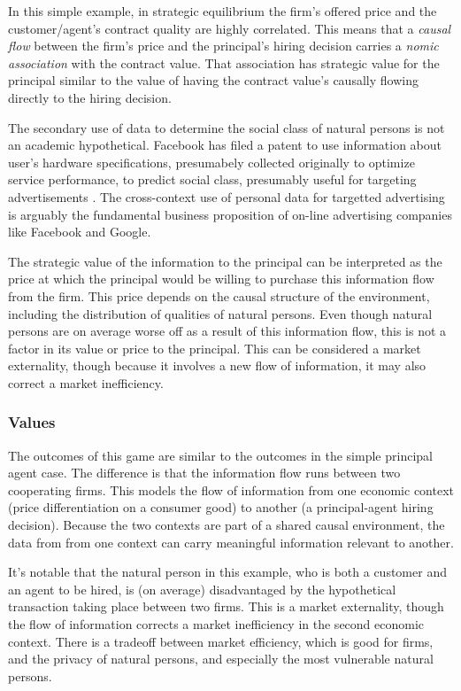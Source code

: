\documentclass[../thesis.tex]{subfiles}
\begin{document}
In this simple example, in strategic equilibrium the firm's offered
price and the customer/agent's contract quality
are highly correlated.
This means that a \emph{causal flow} between the firm's price and
the principal's hiring decision carries a \emph{nomic association}
with the contract value.
That association has strategic value for the principal similar to
the value of having the contract value's causally flowing directly
to the hiring decision.

The secondary use of data to determine the social class of
natural persons is not an academic hypothetical.
Facebook has filed a patent to use information about
user's hardware specifications, presumabely collected originally
to optimize service performance, to predict social class, presumably useful
for targeting advertisements \cite{cb_insights_research_2018}.
The cross-context use of personal data for targetted advertising
is arguably the fundamental business proposition of on-line
advertising companies like Facebook and Google.

The strategic value of the information to the principal can
be interpreted as the price at which the principal would
be willing to purchase this information flow from the firm.
This price depends on the causal structure of the environment,
including the distribution of qualities of natural persons.
Even though natural persons are on average worse off as a result
of this information flow, this is not a factor in its
value or price to the principal.
This can be considered a market externality, though
because it involves a new flow of information, it
may also correct a market inefficiency.

\subsubsection{Values}

The outcomes of this game are similar to the outcomes
in the simple principal agent case.
The difference is that the information flow
runs between two cooperating firms.
This models the flow of information from one
economic context (price differentiation on a consumer good)
to another (a principal-agent hiring decision).
Because the two contexts are part of a shared
causal environment, the data from from one context
can carry meaningful information relevant to another.

It's notable that the natural person in this example,
who is both a customer and an agent to be hired,
is (on average) disadvantaged by the hypothetical
transaction taking place between two firms.
This is a market externality, though the
flow of information corrects a market inefficiency
in the second economic context.
There is a tradeoff between market efficiency,
which is good for firms,
and the privacy of natural persons, and especially
the most vulnerable natural persons.
\end{document}
